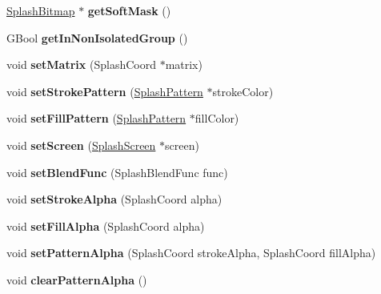 \begin{DoxyCompactItemize}
\hyperlink{class_splash_bitmap}{Splash\+Bitmap} $\ast$ {\bfseries get\+Soft\+Mask} ()
\item 
\mbox{\label{class_splash_a0562500bbb1490e36b4a101898de96ab}} 
G\+Bool {\bfseries get\+In\+Non\+Isolated\+Group} ()
\item 
\mbox{\label{class_splash_a9b45e5ca3d47f49446eed9cc236c0e99}} 
void {\bfseries set\+Matrix} (Splash\+Coord $\ast$matrix)
\item 
\mbox{\label{class_splash_a4b3c915b8edd5de8e586933137d9183a}} 
void {\bfseries set\+Stroke\+Pattern} (\hyperlink{class_splash_pattern}{Splash\+Pattern} $\ast$stroke\+Color)
\item 
\mbox{\label{class_splash_a1b641cc126b71af72bf439eebffdfa5a}} 
void {\bfseries set\+Fill\+Pattern} (\hyperlink{class_splash_pattern}{Splash\+Pattern} $\ast$fill\+Color)
\item 
\mbox{\label{class_splash_ab164a85adeb5b5da2169d39aec2da108}} 
void {\bfseries set\+Screen} (\hyperlink{class_splash_screen}{Splash\+Screen} $\ast$screen)
\item 
\mbox{\label{class_splash_aebff93e49668f8e2445ffad23158c612}} 
void {\bfseries set\+Blend\+Func} (Splash\+Blend\+Func func)
\item 
\mbox{\label{class_splash_a8fa6d6522f721721edeabbd2980945f5}} 
void {\bfseries set\+Stroke\+Alpha} (Splash\+Coord alpha)
\item 
\mbox{\label{class_splash_ad4424e0220eacc754c462bcb1c699f91}} 
void {\bfseries set\+Fill\+Alpha} (Splash\+Coord alpha)
\item 
\mbox{\label{class_splash_a4ff332f9470954ae7ed2b4dafb410031}} 
void {\bfseries set\+Pattern\+Alpha} (Splash\+Coord stroke\+Alpha, Splash\+Coord fill\+Alpha)
\item 
\mbox{\label{class_splash_ad02ead9c42c23297402cf461fe434b89}} 
void {\bfseries clear\+Pattern\+Alpha} ()
\item 
\mbox{\label{class_splash_a1b7ed18dfe91be127dd19504d34bbc82}} 

\end{DoxyCompactItemize}
